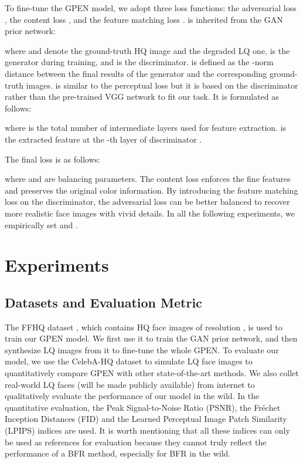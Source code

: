 \documentclass[final]{cvpr}
\begin{document}
To fine-tune the GPEN model, we adopt three loss functions: the adversarial loss , the content loss , and the feature matching loss .  is inherited from the GAN prior network:

where  and  denote the ground-truth HQ image and the degraded LQ one,  is the generator during training, and  is the discriminator.  is defined as the -norm distance between the final results of the generator and the corresponding ground-truth images.  is similar to the perceptual loss \cite{Johnson2016Perceptual} but it is based on the discriminator rather than the pre-trained VGG network to fit our task. It is formulated as follows:

where  is the total number of intermediate layers used for feature extraction.  is the extracted feature at the -th layer of discriminator . 

The final loss  is as follows:

where  and  are balancing parameters. The content loss  enforces the fine features and preserves the original color information. By introducing the feature matching loss  on the discriminator, the adversarial loss  can be better balanced to recover more realistic face images with vivid details. In all the following experiments, we empirically set  and .

























\section{Experiments}
\label{sec:experiments}
\subsection{Datasets and Evaluation Metric}
The FFHQ dataset \cite{Karras2018StyleGAN}, which contains  HQ face images of resolution , is used to train our GPEN model. We first use it to train the GAN prior network, and then synthesize LQ images from it to fine-tune the whole GPEN. To evaluate our model, we use the CelebA-HQ dataset \cite{Karras2018PGGAN} to simulate LQ face images to quantitatively compare GPEN with other state-of-the-art methods. We also collet  real-world LQ faces (will be made publicly available) from internet to qualitatively evaluate the performance of our model in the wild. In the quantitative evaluation, the Peak Signal-to-Noise Ratio (PSNR),  the Fr\'echet Inception Distances (FID) \cite{Heusel2017FID} and the Learned Perceptual Image Patch Similarity (LPIPS) \cite{Zhang2018LPIPS} indices are used. It is worth mentioning that all these indices can only be used as references for evaluation because they cannot truly reflect the performance of a BFR method, especially for BFR in the wild. 
\end{document}
